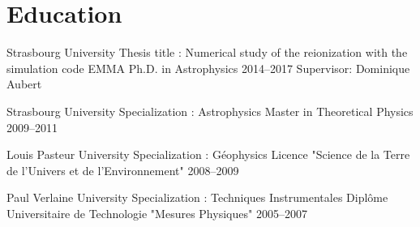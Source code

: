 \documentclass[11pt,a4paper,sans]{moderncv}
\begin{document}


\section{Education}

\cventry
{Strasbourg University}
{Thesis title : Numerical study of the reionization with the simulation code EMMA}
{Ph.D. in Astrophysics}
{2014--2017}
{}
{Supervisor: Dominique Aubert}


\cventry
{Strasbourg University}
{Specialization : Astrophysics}
{Master in Theoretical Physics}
{2009--2011}
{}
{}

\cventry
{Louis Pasteur University}
{Specialization : Géophysics}
{Licence "Science de la Terre de l'Univers et de l’Environnement"}
{2008--2009}
{}
{}


\cventry
{Paul Verlaine University}
{Specialization : Techniques Instrumentales}
{Diplôme Universitaire de Technologie "Mesures Physiques"}
{2005--2007}
{}
{}








\end{document}

